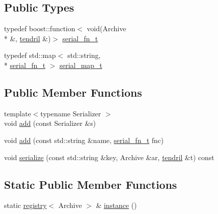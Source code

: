\subsection*{Public Types}
\begin{DoxyCompactItemize}
\item 
typedef boost\-::function$<$ void(Archive \\*
\&, \hyperlink{classecto_1_1tendril}{tendril} \&)$>$ \hyperlink{structecto_1_1serialization_1_1registry_a9bbc5358e0b5bb519983c16db9c6391b}{serial\-\_\-fn\-\_\-t}
\item 
typedef std\-::map$<$ std\-::string, \\*
\hyperlink{structecto_1_1serialization_1_1registry_a9bbc5358e0b5bb519983c16db9c6391b}{serial\-\_\-fn\-\_\-t} $>$ \hyperlink{structecto_1_1serialization_1_1registry_a89253dc4749e297b132dacb9e14967c2}{serial\-\_\-map\-\_\-t}
\end{DoxyCompactItemize}
\subsection*{Public Member Functions}
\begin{DoxyCompactItemize}
\item 
{\footnotesize template$<$typename Serializer $>$ }\\void \hyperlink{structecto_1_1serialization_1_1registry_ae82f89f8e2bdcf2573671a6d390a94e2}{add} (const Serializer \&s)
\item 
void \hyperlink{structecto_1_1serialization_1_1registry_a9642b0813d8bb6c99dffb527b9d57419}{add} (const std\-::string \&name, \hyperlink{structecto_1_1serialization_1_1registry_a9bbc5358e0b5bb519983c16db9c6391b}{serial\-\_\-fn\-\_\-t} fnc)
\item 
void \hyperlink{structecto_1_1serialization_1_1registry_afaecca49afab42cb3f41a7a515b69cbb}{serialize} (const std\-::string \&key, Archive \&ar, \hyperlink{classecto_1_1tendril}{tendril} \&t) const 
\end{DoxyCompactItemize}
\subsection*{Static Public Member Functions}
\begin{DoxyCompactItemize}
\item 
static \hyperlink{structecto_1_1serialization_1_1registry}{registry}$<$ Archive $>$ \& \hyperlink{structecto_1_1serialization_1_1registry_a19aae99a3cc5ddb4b56d069faf01e300}{instance} ()
\end{DoxyCompactItemize}
